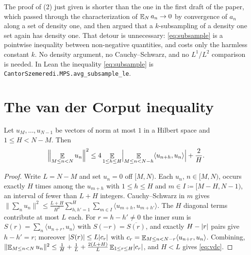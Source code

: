 \begin{remark}
  \leanok
  The proof of (2) just given is shorter than the one in the first draft of the paper, which
  passed through the characterization of $\mathop{\mathbb{E}}_{N}a_n \to 0$ by convergence of $a_n$ along a set
  of density one, and then argued that a $k$-subsampling of a density one set again has density
  one.  That detour is unnecessary: \eqref{eq:subsample} is a pointwise inequality between
  non-negative quantities, and costs only the harmless constant $k$.  No density argument, no
  Cauchy--Schwarz, and no $L^1$/$L^2$ comparison is needed.  In Lean the inequality
  \eqref{eq:subsample} is \texttt{CantorSzemeredi.MPS.avg\_subsample\_le}.
\end{remark}

\section{The van der Corput inequality}

\begin{lemma}
  \label{lem:vdc}
  \leanok
  Let $u_M,\dots,u_{N-1}$ be vectors of norm at most $1$ in a Hilbert space and $1 \leq H < N-M$.
  Then
  \begin{equation}
    \label{eq:vdc}
    \Bigl\lVert \mathop{\mathbb{E}}_{M \leq n < N} u_n \Bigr\rVert^2
      \leq 4 \mathop{\mathbb{E}}_{1 \leq h \leq H} \Bigl\lvert \mathop{\mathbb{E}}_{M \leq n < N-h} \langle u_{n+h}, u_n \rangle \Bigr\rvert
        + \frac{2}{H} .
  \end{equation}
\end{lemma}

\begin{proof}
  \leanok
  Write $L = N-M$ and set $u_n = 0$ off $[M,N)$.  Each $u_n$, $n \in [M,N)$, occurs exactly $H$
  times among the $u_{m+h}$ with $1 \leq h \leq H$ and $m \in I \coloneqq [M-H, N-1)$, an
  interval of fewer than $L+H$ integers.  Cauchy--Schwarz in $m$ gives
  $\lVert \sum_n u_n \rVert^2 \leq \frac{L+H}{H^2}\sum_{h,h'=1}^{H}\sum_{m \in I}\langle u_{m+h}, u_{m+h'}\rangle$.
  The $H$ diagonal terms contribute at most $L$ each.  For $r = h-h' \neq 0$ the inner sum is
  $S(r) = \sum_n \langle u_{n+r}, u_n\rangle$ with $S(-r) = \overline{S(r)}$, and exactly
  $H - \lvert r \rvert$ pairs give $h - h' = r$; moreover $\lvert S(r) \rvert \leq L\lvert c_r \rvert$ with
  $c_r = \mathop{\mathbb{E}}_{M \leq n < N-r}\langle u_{n+r}, u_n\rangle$.  Combining,
  $\lVert \mathop{\mathbb{E}}_{M \leq n < N} u_n \rVert^2 \leq \frac1H + \frac1L + \frac{2(L+H)}{L}\mathop{\mathbb{E}}_{1 \leq r \leq H}\lvert c_r \rvert$,
  and $H < L$ gives \eqref{eq:vdc}.
\end{proof}

